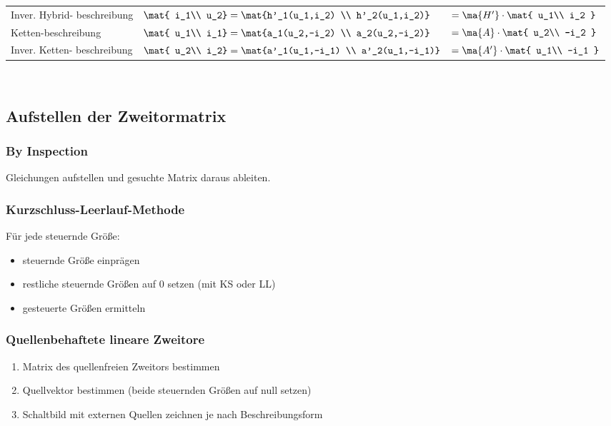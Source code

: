 \documentclass[fs, footer]{latex4ei}
\begin{document}
\begin{multicols*}{4}
\begin{tabular}{@{}p{1.3cm}|ll@{}}
		Inver. Hybrid- beschreibung & $\mat{ i_1\\ u_2} = \mat{h'_1(u_1,i_2) \\ h'_2(u_1,i_2)}$ & $= \ma{H'} \cdot \mat{ u_1\\ i_2 }$ \\ \mrule
		Ketten-beschreibung & $\mat{ u_1\\ i_1} = \mat{a_1(u_2,-i_2) \\ a_2(u_2,-i_2)}$ & $= \ma{A} \cdot \mat{ u_2\\ -i_2 }$\\ \mrule
		Inver. Ketten- beschreibung & $\mat{ u_2\\ i_2} = \mat{a'_1(u_1,-i_1) \\ a'_2(u_1,-i_1)}$ &  $= \ma{A'} \cdot \mat{ u_1\\ -i_1 }$

	\end{tabular}\\

	\subsection{Aufstellen der Zweitormatrix}
	\subsubsection{By Inspection}
	Gleichungen aufstellen und gesuchte Matrix daraus ableiten.
	\subsubsection{Kurzschluss-Leerlauf-Methode}
	Für jede steuernde Größe:
	\begin{itemize}
		\item steuernde Größe einprägen
		\item restliche steuernde Größen auf 0 setzen (mit KS oder LL)
		\item gesteuerte Größen ermitteln
	\end{itemize}
	\subsubsection{Quellenbehaftete lineare Zweitore}
	\begin{enumerate}\itemsep0pt
		\item Matrix des quellenfreien Zweitors bestimmen
		\item Quellvektor bestimmen (beide steuernden Größen auf null setzen)
		\item Schaltbild mit externen Quellen zeichnen je nach Beschreibungsform
	\end{enumerate}




\end{multicols*}
\end{document}
